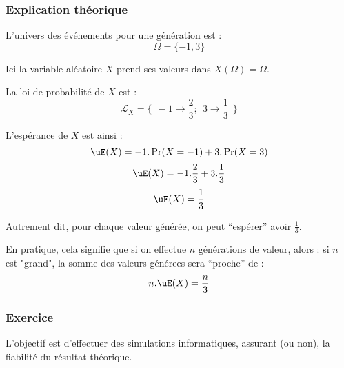 \subsubsection*{Explication théorique}

L'univers des événements pour une génération est : 
$$\Omega = \{-1, 3\}$$

Ici la variable aléatoire $X$ prend ses valeurs dans $X(\Omega) = \Omega$.

La loi de probabilité de $X$ est : 
$$
\mathcal{L}_X = \{
~~ -1 \rightarrow \frac{2}{3} ;
~~ 3 \rightarrow \frac{1}{3}
~~\}
$$

L'espérance de $X$ est ainsi :
$$\uE(X) = -1.\Pr(X=-1) + 3.\Pr(X=3) $$ 
$$\uE(X) = -1.\frac{2}{3} + 3.\frac{1}{3}$$
$$\uE(X) = \frac{1}{3}$$


Autrement dit, pour chaque valeur générée, 
on peut ``espérer'' avoir $\frac{1}{3}$.

En pratique, cela signifie que si on effectue $n$ 
générations de valeur,
alors :
si $n$ est "grand", 
la somme des valeurs générees sera ``proche'' de : 
$$n.\uE(X) = \frac{n}{3}$$












\subsubsection*{Exercice}
L'objectif est d'effectuer des simulations informatiques,
assurant (ou non), la fiabilité du résultat théorique.
